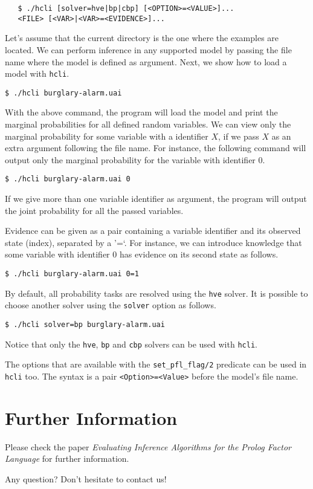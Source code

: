 \documentclass{article}
\begin{document}
\begin{verbatim}
   $ ./hcli [solver=hve|bp|cbp] [<OPTION>=<VALUE>]...
   <FILE> [<VAR>|<VAR>=<EVIDENCE>]...
\end{verbatim}

Let's assume that the current directory is the one where the examples are located. We can perform inference in any supported model by passing the file name where the model is defined as argument. Next, we show how to load a model with \texttt{hcli}.

\texttt{\$ ./hcli burglary-alarm.uai}

With the above command, the program will load the model and print the marginal probabilities for all defined random variables. We can view only the marginal probability for some variable with a identifier $X$, if we pass $X$ as an extra argument following the file name. For instance, the following command will output only the marginal probability for the variable with identifier $0$.

\texttt{\$ ./hcli burglary-alarm.uai 0}

If we give more than one variable identifier as argument, the program will output the joint probability for all the passed variables.

Evidence can be given as a pair containing a variable identifier and its observed state (index), separated by a '=`. For instance, we can introduce knowledge that some variable with identifier $0$ has evidence on its second state as follows.

\texttt{\$ ./hcli burglary-alarm.uai 0=1}

By default, all probability tasks are resolved using the \texttt{hve} solver. It is possible to choose another solver using the \texttt{solver} option as follows.

\texttt{\$ ./hcli solver=bp burglary-alarm.uai}

Notice that only the \texttt{hve}, \texttt{bp} and \texttt{cbp} solvers can be used with \texttt{hcli}.

The options that are available with the \texttt{set\_pfl\_flag/2} predicate can be used in \texttt{hcli} too. The syntax is a pair \texttt{<Option>=<Value>} before the model's file name.



\section{Further Information}
Please check the paper \textit{Evaluating Inference Algorithms for the Prolog Factor Language} for further information.

Any question? Don't hesitate to contact us!
\end{document}
